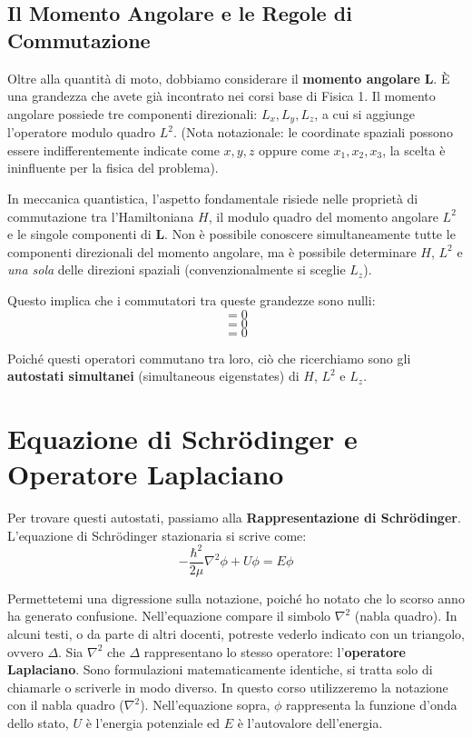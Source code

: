 \subsection{Il Momento Angolare e le Regole di Commutazione}

Oltre alla quantità di moto, dobbiamo considerare il \textbf{momento angolare} $\mathbf{L}$. È una grandezza che avete già incontrato nei corsi base di Fisica 1.
Il momento angolare possiede tre componenti direzionali: $L_x, L_y, L_z$, a cui si aggiunge l'operatore modulo quadro $L^2$. (Nota notazionale: le coordinate spaziali possono essere indifferentemente indicate come $x, y, z$ oppure come $x_1, x_2, x_3$, la scelta è ininfluente per la fisica del problema).

In meccanica quantistica, l'aspetto fondamentale risiede nelle proprietà di commutazione tra l'Hamiltoniana $H$, il modulo quadro del momento angolare $L^2$ e le singole componenti di $\mathbf{L}$.
Non è possibile conoscere simultaneamente tutte le componenti direzionali del momento angolare, ma è possibile determinare $H$, $L^2$ e \textit{una sola} delle direzioni spaziali (convenzionalmente si sceglie $L_z$).

Questo implica che i commutatori tra queste grandezze sono nulli:
\begin{equation}
[H, L^2] = 0
\end{equation}
\begin{equation}
[H, L_z] = 0
\end{equation}
\begin{equation}
[L^2, L_z] = 0
\end{equation}

Poiché questi operatori commutano tra loro, ciò che ricerchiamo sono gli \textbf{autostati simultanei} (simultaneous eigenstates) di $H$, $L^2$ e $L_z$.

\section{Equazione di Schrödinger e Operatore Laplaciano}

Per trovare questi autostati, passiamo alla \textbf{Rappresentazione di Schrödinger}. L'equazione di Schrödinger stazionaria si scrive come:
\begin{equation}
-\frac{\hbar^2}{2\mu} \nabla^2 \phi + U \phi = E \phi
\end{equation}

Permettetemi una digressione sulla notazione, poiché ho notato che lo scorso anno ha generato confusione. Nell'equazione compare il simbolo $\nabla^2$ (nabla quadro). In alcuni testi, o da parte di altri docenti, potreste vederlo indicato con un triangolo, ovvero $\Delta$.
Sia $\nabla^2$ che $\Delta$ rappresentano lo stesso operatore: l'\textbf{operatore Laplaciano}. Sono formulazioni matematicamente identiche, si tratta solo di chiamarle o scriverle in modo diverso. In questo corso utilizzeremo la notazione con il nabla quadro ($\nabla^2$). Nell'equazione sopra, $\phi$ rappresenta la funzione d'onda dello stato, $U$ è l'energia potenziale ed $E$ è l'autovalore dell'energia.

